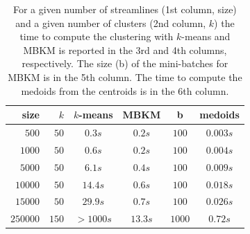 \begin{table}
  \centering
  \begin{tabular}{ r | r || c | c || c || c }
    size & $k$ & $k$-means & MBKM & b &  medoids \\
    \hline
    \hline
    $500$    &  $50$ &  $0.3s$ &  $\mathbf{0.2}s$ &  $100$ &  $0.003s$ \\
    \hline
    $1000$   &  $50$ &  $0.6s$ &  $\mathbf{0.2}s$ &  $100$ &  $0.004s$ \\
    \hline
    $5000$   &  $50$ &  $6.1s$ &  $\mathbf{0.4}s$ &  $100$ &  $0.009s$ \\
    \hline
    $10000$  &  $50$ & $14.4s$ &  $\mathbf{0.6}s$ & $100$ &   $0.018s$ \\
    \hline
    $15000$  &  $50$ & $29.9s$ &  $\mathbf{0.7}s$ & $100$ &  $0.026s$ \\
    \hline
    $250000$ & $150$ & $>1000s$ & $\mathbf{13.3}s$ &  $1000$  &  $0.72s$ \\
    \hline
  \end{tabular}
  \caption{For a given number of streamlines (1st column, size) and a
    given number of clusters (2nd column, $k$) the time to compute the
    clustering with $k$-means and MBKM is reported in the 3rd and 4th
    columns, respectively. The size (b) of the mini-batches for MBKM is
    in the 5th column. The time to compute the medoids from the
    centroids is in the 6th column.}
  \label{tab:results}
\end{table}



